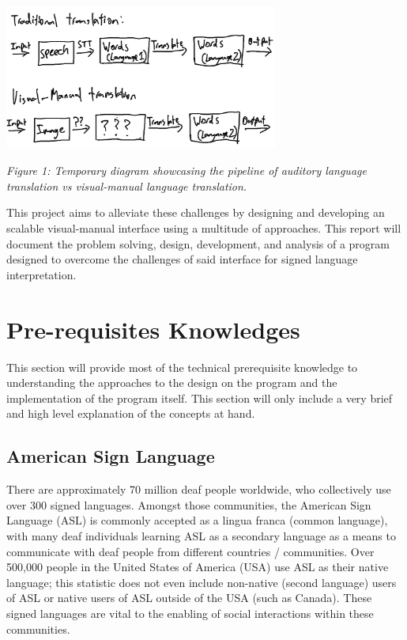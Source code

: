 \documentclass[11pt]{article}
\begin{document}
    \begin{center}
        \includegraphics[width=9cm]{audVsVM.png}
        \\
        \raggedright \textit{
        Figure 1: Temporary diagram showcasing the pipeline of auditory language translation vs visual-manual language translation.
        }
    \end{center}

    This project aims to alleviate these challenges by designing and developing an scalable visual-manual interface using a multitude of approaches. This report will document the problem solving, design, development, and analysis of a program designed to overcome the challenges of said interface for signed language interpretation.


\section{Pre-requisites Knowledges}
    This section will provide most of the technical prerequisite knowledge to understanding the approaches to the design on the program and the implementation of the program itself. This section will only include a very brief and high level explanation of the concepts at hand.

    \subsection{American Sign Language}
        There are approximately 70 million deaf people worldwide, who collectively use over 300 signed languages. Amongst those communities, the American Sign Language (ASL) is commonly accepted as a lingua franca (common language), with many deaf individuals learning ASL as a secondary language as a means to communicate with deaf people from different countries / communities. Over 500,000 people in the United States of America (USA) use ASL as their native language; this statistic does not even include non-native (second language) users of ASL or native users of ASL outside of the USA (such as Canada). These signed languages are vital to the enabling of social interactions within these communities. 
\end{document}
